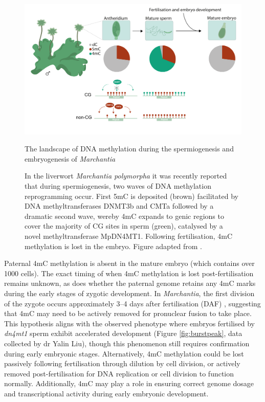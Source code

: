\begin{figure}[htbp!] 
\centering    
    \includegraphics[width=1\textwidth]{Chapter3/Figs/Intro/Graphical_abstract.pdf}
\caption{The landscape of DNA methylation during the spermiogenesis and embryogenesis of \textit{Marchantia}}
\label{fig:Mp_graphical_abstract}
\captionsetup{font=small}
    \caption*{In the liverwort \textit{Marchantia polymorpha }it was recently reported \cite{RN189} that during spermiogenesis, two waves of DNA methylation reprogramming occur. First 5mC is deposited (brown) facilitated by DNA methyltransferases DNMT3b and CMTa followed by a dramatic second wave, wereby 4mC expands to genic regions to cover the majority of CG sites in sperm (green), catalysed by a novel methyltransferase MpDN4MT1. Following fertilisation,  4mC methylation is lost in the embryo. Figure adapted from \cite{RN189}.}
\end{figure}

Paternal 4mC methylation is absent in the mature embryo (which contains over 1000 cells). The exact timing of when 4mC methylation is lost post-fertilisation remains unknown, as does whether the paternal genome retains any 4mC marks during the early stages of zygotic development. In \textit{Marchantia}, the first division of the zygote occurs approximately 3–4 days after fertilisation (DAF) \cite{RN139}, suggesting that 4mC may need to be actively removed for pronuclear fusion to take place. This hypothesis aligns with the observed phenotype where embryos fertilised by \textit{dn4mt1} sperm exhibit accelerated development (Figure \ref{fig:burstpeak}, data collected by dr Yalin Liu), though this phenomenon still requires confirmation during early embryonic stages. Alternatively, 4mC methylation could be lost passively following fertilisation through dilution by cell division, or actively removed post-fertilisation for DNA replication or cell division to function normally. Additionally, 4mC may play a role in ensuring correct genome dosage and transcriptional activity during early embryonic development.

